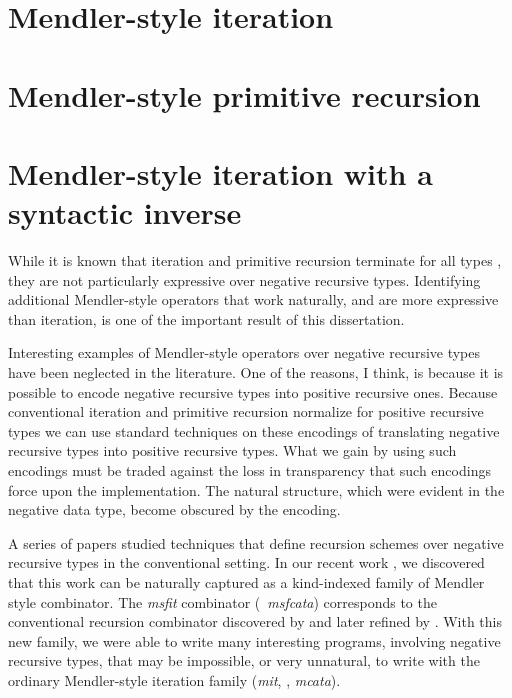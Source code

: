 
\section{Mendler-style iteration} \label{sec:mit}


\section{Mendler-style primitive recursion} \label{sec:mpr}

\section{Mendler-style iteration with a syntactic inverse} \label{sec:msf}

While it is known that iteration and primitive recursion terminate for all types
\cite{AbeMatUus05,AbeMat04}, they are not particularly expressive over negative
recursive types. Identifying additional Mendler-style operators that work
naturally, and are more expressive than iteration, is one of the important
result of this dissertation.

Interesting examples of Mendler-style operators over negative recursive types
have been neglected in the literature. One of the reasons, I think, is because
it is possible to encode negative recursive types into positive recursive ones.
Because conventional iteration and primitive recursion normalize for
positive recursive types we can use standard techniques on these encodings
of translating negative recursive types into positive recursive types.
What we gain by using such encodings must be traded against the loss in
transparency that such encodings force upon the implementation. The natural
structure, which were evident in the negative data type, become obscured by
the encoding.

A series of papers \cite{Pat93,MeiHut95,FegShe96,DesPfeSch97,bgb} studied 
techniques that define recursion schemes over negative recursive types in
the conventional setting. In our recent work \cite{AhnShe11}, we discovered
that this work can be naturally captured as a kind-indexed family of Mendler
style combinator. The \textit{msfit} combinator (\aka\ \textit{msfcata})
corresponds to the conventional recursion combinator discovered
by \citet{FegShe96} and later refined by \citet{bgb}.
With this new family, we were able to write many interesting programs,
involving negative recursive types, that may be impossible, or very unnatural,
to write with the ordinary Mendler-style iteration family (\textit{mit},
\aka, \textit{mcata}).

